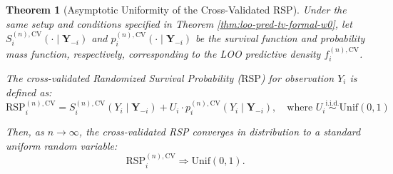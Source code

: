 \documentclass[
  12pt]{article}
\theoremstyle{plain}
\newtheorem{theorem}{Theorem}[section]
\theoremstyle{definition}
\theoremstyle{remark}
\begin{document}
\begin{theorem}[Asymptotic Uniformity of the Cross-Validated RSP]
\label{thm:cvrsp-unif}
Under the same setup and conditions specified in Theorem \ref{thm:loo-pred-tv-formal-w0}, let $S_i^{(n),\mathrm{CV}}(\cdot \mid \mathbf{Y}_{-i})$ and $p_i^{(n),\mathrm{CV}}(\cdot \mid \mathbf{Y}_{-i})$ be the survival function and probability mass function, respectively, corresponding to the LOO predictive density $f_i^{(n),\mathrm{CV}}$.

The cross-validated Randomized Survival Probability ($\mathrm{RSP}$) for observation $Y_i$ is defined as:
\begin{equation}
\mathrm{RSP}_i^{(n),\mathrm{CV}} = S_i^{(n),\mathrm{CV}}(Y_i \mid \mathbf{Y}_{-i}) + U_i \cdot p_i^{(n),\mathrm{CV}}(Y_i \mid \mathbf{Y}_{-i}), \quad \text{where } U_i \stackrel{\text{i.i.d.}}{\sim} \mathrm{Unif}(0,1)
\end{equation}

Then, as $n\to\infty$, the cross-validated RSP converges in distribution to a standard uniform random variable:\begin{equation} \mathrm{RSP}_i^{(n),\mathrm{CV}} \Rightarrow \mathrm{Unif}(0,1).\end{equation}

\end{theorem}
\end{document}

